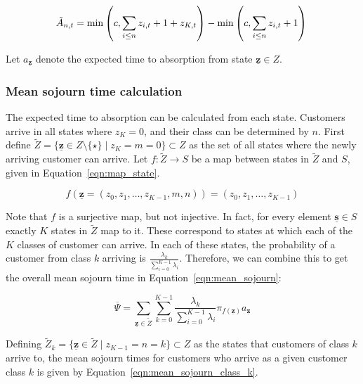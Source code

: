 \documentclass{article}
\begin{document}
\begin{equation}\label{eqn:inservice_adapt_tilde}
\tilde{A}_{n,t} =
\min\left(c, \sum_{i \leq n} z_{i,t} + 1 + z_{K,t}\right) - \min\left(c, \sum_{i \leq n} z_{i,t} + 1\right) \\
\end{equation}

Let $a_{\underline{\mathbf{z}}}$ denote the expected time to absorption
from state $\underline{\mathbf{z}} \in Z$.


\subsubsection{Mean sojourn time calculation}\label{sec:meansojourncalc}
The expected time to absorption can be calculated from each state.
Customers arrive in all states where $z_K = 0$, and their class can be
determined by $n$. First define
$\tilde{Z} = \{\underline{\mathbf{z}} \in Z\setminus\{\star\} \; | \; z_K = m = 0\} \subset Z$
as the set of all states where the newly arriving customer can arrive.
Let $f: \tilde{Z} \rightarrow S$ be a map between states in $\tilde{Z}$ and $S$,
given in Equation~\ref{eqn:map_state}.

\begin{equation}\label{eqn:map_state}
f\left(\underline{\mathbf{z}} = (z_0, z_1, \dots, z_{K-1}, m, n) \right) = (z_0, z_1, \dots, z_{K-1})
\end{equation}

Note that $f$ is a surjective map, but not injective. In fact, for every element
$\underline{\mathbf{s}} \in S$ exactly $K$ states in $\tilde{Z}$ map to it.
These correspond to states at which each of the $K$ classes of customer can
arrive. In each of these states, the probability of a customer from class $k$
arriving is $\frac{\lambda_k}{\sum_{i=0}^{K-1} \lambda_i}$. Therefore, we can
combine this to get the overall mean sojourn time in
Equation~\ref{eqn:mean_sojourn}:

\begin{equation}\label{eqn:mean_sojourn}
\overline{\Psi} = \sum_{\underline{\mathbf{z}} \in \tilde{Z}} \sum_{k=0}^{K-1} \frac{\lambda_k}{\sum_{i=0}^{K-1} \lambda_i} \pi_{f(\underline{\mathbf{z}})} a_{\underline{\mathbf{z}}}
\end{equation}

Defining $\tilde{Z}_k = \{\underline{\mathbf{z}} \in \tilde{Z} \; | \; z_{K-1} = n = k\} \subset Z$
as the states that customers of class $k$ arrive to, the mean sojourn times for
customers who arrive as a given customer class $k$ is given by
Equation~\ref{eqn:mean_sojourn_class_k}.
\end{document}
